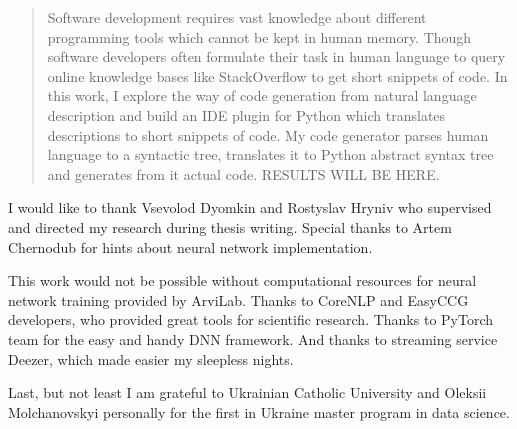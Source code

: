 \documentclass[
12pt, %
oneside, %
english, %
onehalfspacing, %
nolistspacing, %
liststotoc, %
parskip, %
headsepline, %
]{MastersDoctoralThesis} %
\begin{document}
\cleardoublepage




\begin{abstract}
\addchaptertocentry{\abstractname} %
Software development requires vast knowledge about different programming tools which cannot be kept in human memory. Though software developers often formulate their task in human language to query online knowledge bases like StackOverflow to get short snippets of code. In this work, I explore the way of code generation from natural language description and build an IDE plugin for Python which translates descriptions to short snippets of code. My code generator parses human language to a syntactic tree, translates it to Python abstract syntax tree and generates from it actual code. RESULTS WILL BE HERE.
\end{abstract}


\begin{acknowledgements}
\addchaptertocentry{\acknowledgementname} %
I would like to thank Vsevolod Dyomkin and Rostyslav Hryniv who supervised and directed my research during thesis writing. Special thanks to Artem Chernodub for hints about neural network implementation.

This work would not be possible without computational resources for neural network training provided by ArviLab. Thanks to CoreNLP and EasyCCG developers, who provided great tools for scientific research. Thanks to PyTorch team for the easy and handy DNN framework. And thanks to streaming service Deezer, which made easier my sleepless nights.

Last, but not least I am grateful to Ukrainian Catholic University and Oleksii Molchanovskyi personally for the first in Ukraine master program in data science.
\end{acknowledgements}
\end{document}
